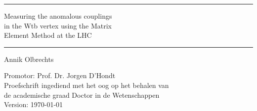 \vspace{1.5cm}
\begin{minipage}{\textwidth}
  \begin{flushleft}
    \rule{\textwidth}{1mm}
  \end{flushleft}
  \begin{center}
    \begin{bfseries}
      \begin{sffamily}
        \begin{Huge}%
          Measuring the anomalous couplings \\ \vspace{0.2cm}
          in the Wtb vertex using the Matrix \\ \vspace{0.4cm}
          Element Method at the LHC
        \end{Huge}
      \end{sffamily}
    \end{bfseries}
  \end{center}
  \begin{flushright}
    \rule{\textwidth}{1mm}
  \end{flushright}
\end{minipage}

\vspace{1.5cm}
\begin{minipage}{\textwidth}
  \begin{center}
    \begin{bfseries}
      \begin{sffamily}
        \begin{LARGE}
          Annik Olbrechts\\
        \end{LARGE}
      \end{sffamily}
    \end{bfseries}
  \end{center}
\end{minipage}

\vspace{1.5cm}
\begin{minipage}{\textwidth}
  \begin{center}
    \begin{large}
      Promotor:  Prof. Dr. Jorgen D'Hondt\\[5mm]
      Proefschrift ingediend met het oog op het behalen van\\
      de academische graad Doctor in de Wetenschappen\\[10mm]
      Version: \today
    \end{large}
  \end{center}
\end{minipage}


